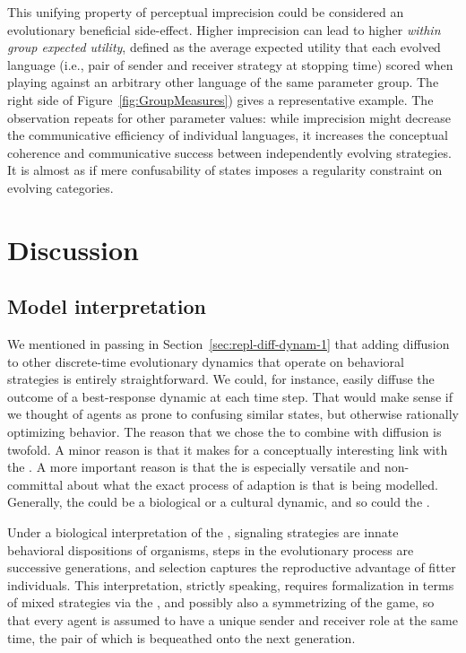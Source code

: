 \documentclass[fleqn,reqno,10pt]{article}
\newcommand{\rd}{\acro{rd}} %
\newcommand{\rmd}{\acro{rmd}} %
\newcommand{\rdd}{\acro{rdd}} %
\begin{document}
This unifying property of perceptual imprecision could be considered
an evolutionary beneficial side-effect. Higher imprecision can lead to
higher \emph{within group expected utility}, defined as the average
expected utility that each evolved language (i.e., pair of sender and
receiver strategy at stopping time) scored when playing against an
arbitrary other language of the same parameter group. The right side
of Figure~\ref{fig:GroupMeasures}) gives a representative example. The
observation repeats for other parameter values: while imprecision
might decrease the communicative efficiency of individual languages,
it increases the conceptual coherence and communicative success
between independently evolving strategies. It is almost as if mere
confusability of states imposes a regularity constraint on evolving
categories.


\section{Discussion}
\label{sec:discussion}

\subsection{Model interpretation}
\label{sec:model-interpretation}

We mentioned in passing in Section~\ref{sec:repl-diff-dynam-1} that
adding diffusion to other discrete-time evolutionary dynamics that
operate on behavioral strategies is entirely straightforward. We
could, for instance, easily diffuse the outcome of a best-response
dynamic at each time step. That would make sense if we thought of
agents as prone to confusing similar states, but otherwise rationally
optimizing behavior. The reason that we chose the \rd to combine with
diffusion is twofold. A minor reason is that it makes for a
conceptually interesting link with the \rmd. A more important reason
is that the \rd is especially versatile and non-committal about what
the exact process of adaption is that is being modelled. Generally,
the \rd could be a biological or a cultural dynamic, and so could the
\rdd.

Under a biological interpretation of the \rd, signaling strategies
are innate behavioral dispositions of organisms, steps in the
evolutionary process are successive generations, and selection
captures the reproductive advantage of fitter individuals. This
interpretation, strictly speaking, requires formalization in terms of
mixed strategies via the \rmd, and possibly also a symmetrizing of the
game, so that every agent is assumed to have a unique sender and
receiver role at the same time, the pair of which is bequeathed onto
the next generation. 
\end{document}
